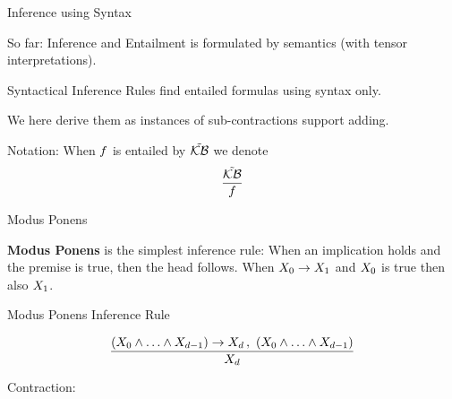 \documentclass{beamer}
\begin{document}
    \begin{frame}{Inference using Syntax}

        So far: Inference and Entailment is formulated by semantics (with tensor interpretations).

        Syntactical Inference Rules find entailed formulas using syntax only.

        We here derive them as instances of sub-contractions support adding.

        Notation: When $f$ is entailed by $\tilde{\mathcal{KB}}$ we denote
        \begin{align*}
            \frac{
                \tilde{\mathcal{KB}}
            }{
                f
            }
        \end{align*}

    \end{frame}

    \begin{frame}{Modus Ponens}

        {\bf Modus Ponens} is the simplest inference rule: When an implication holds and the premise is true, then the head follows.
        When $X_{0}\rightarrow X_{1}$ and $X_{0}$ is true then also $X_{1}$.

        \begin{block}{Modus Ponens Inference Rule}

            \begin{align*}
                \frac{
                    (X_{0}\land\ldots\land X_{d-1})\rightarrow X_{d} \,,\,\, (X_{0}\land\ldots\land X_{d-1})
                }{
                    X_{d}
                }
            \end{align*}
        \end{block}



        Contraction:
        \begin{center}
            
        \end{center}
    \end{frame}
\end{document}
